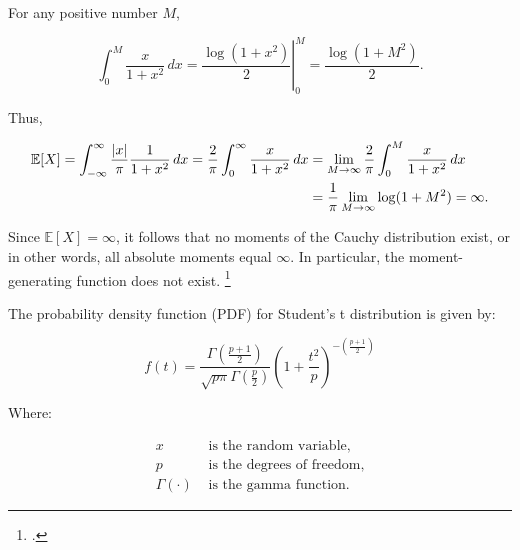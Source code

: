 \documentclass[UTF8,a4paper,10pt]{article}
\begin{document}
For any positive number \(M\), 

\[\int_{0}^{M} \frac{x}{1+x^2}\,dx = \left.\frac{\log (1+x^2)}{2}\right\vert_0^{M} = \frac{\log (1+M^2)}{2}.\]

Thus, 


\begin{align*}
  \operatorname{\mathbb{E}}[X] = \int_{-\infty}^{\infty} \frac{|x|}{\pi}\frac{1}{1+x^2} \, dx 
  = \frac{2}{\pi}\int_{0}^{\infty} \frac{x}{1+x^2}\,dx 
  &= \lim_{M\to\infty}\frac{2}{\pi}\int_{0}^{M} \frac{x}{1+x^2}\,dx \\
  &= \frac{1}{\pi}\lim_{M\to\infty} \log (1+M^2) = \infty.
  \end{align*}
  

Since \(\mathbb{E}[X] = \infty\), it follows that no moments of the Cauchy distribution exist, or in other words, all absolute moments equal \(\infty\). In particular, the moment-generating function does not exist. 
\footcite[][108]{Casella2002}




\dotfill

The probability density function (PDF) for Student's t distribution is given by:

\[
f(t) = \frac{\Gamma\left(\frac{p+1}{2}\right)}{\sqrt{p\pi}\Gamma\left(\frac{p}{2}\right)} \left(1 + \frac{t^2}{p}\right)^{-\left(\frac{p+1}{2}\right)}
\]

Where:

\begin{align*}
x & \text{ is the random variable,}\\
p & \text{ is the degrees of freedom,}\\
\Gamma(\cdot) & \text{ is the gamma function.}
\end{align*}
\end{document}
